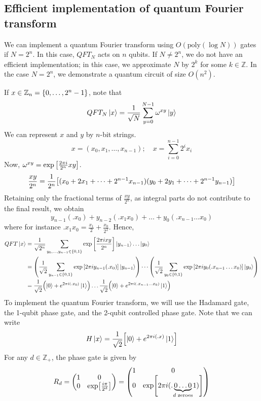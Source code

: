 \subsection{Efficient implementation of quantum Fourier transform}
We can implement a quantum Fourier transform using \( O(\mathrm{poly}(\log N)) \) gates if \( N = 2^n \).
In this case, \( QFT_N \) acts on \( n \) qubits.
If \( N \neq 2^n \), we do not have an efficient implementation; in this case, we approximate \( N \) by \( 2^k \) for some \( k \in \mathbb Z \).
In the case \( N = 2^n \), we demonstrate a quantum circuit of size \( O(n^2) \).

If \( x \in \mathbb Z_n = \qty{0, \dots, 2^n - 1} \), note that
\[ QFT_N \ket{x} = \frac{1}{\sqrt{N}} \sum_{y=0}^{N-1} \omega^{xy} \ket{y} \]
We can represent \( x \) and \( y \) by \( n \)-bit strings.
\[ x = (x_0, x_1, \dots, x_{n-1});\quad x = \sum_{i=0}^{n-1} 2^i x_i \]
Now, \( \omega^{xy} = \exp\qty[\frac{2\pi i}{2^n} xy] \).
\[ \frac{xy}{2^n} = \frac{1}{2^n} \qty[(x_0 + 2x_1 + \dots + 2^{n-1} x_{n-1})(y_0 + 2y_1 + \dots + 2^{n-1} y_{n-1})] \]
Retaining only the fractional terms of \( \frac{xy}{2^n} \), as integral parts do not contribute to the final result, we obtain
\[ y_{n-1}(.x_0) + y_{n-2}(.x_1 x_0) + \dots + y_0(.x_{n-1} \dots x_0) \]
where for instance \( .x_1 x_0 = \frac{x_1}{2} + \frac{x_0}{2^2} \).
Hence,
\begin{align*}
    QFT \ket{x} &= \frac{1}{\sqrt{2^n}} \sum_{y_0, \dots, y_{n-1} \in \qty{0,1}} \exp\qty[\frac{2\pi i xy}{2^n}] \ket{y_{n-1}} \dots \ket{y_0} \\
    &= \qty(\frac{1}{\sqrt{2}} \sum_{y_{n-1} \in \qty{0,1}} \exp\qty[2 \pi i y_{n-1} (.x_0)] \ket{y_{n-1}}) \cdots \qty(\frac{1}{\sqrt{2}} \sum_{y_0 \in \qty{0,1}} \exp\qty[2 \pi i y_0 (.x_{n-1}\dots x_0)] \ket{y_0}) \\
    &= \frac{1}{\sqrt{2}} \qty(\ket{0} + e^{2\pi i (.x_0)} \ket{1}) \dots \frac{1}{\sqrt{2}} \qty(\ket{0} + e^{2\pi i (.x_{n-1} \dots x_0)} \ket{1})
\end{align*}
To implement the quantum Fourier transform, we will use the Hadamard gate, the 1-qubit phase gate, and the 2-qubit controlled phase gate.
Note that we can write
\[ H\ket{x} = \frac{1}{\sqrt{2}} \qty[\ket{0} + e^{2\pi i(.x)} \ket{1}] \]
For any \( d \in \mathbb Z_+ \), the phase gate is given by
\[ R_d = \begin{pmatrix}
    1 & 0 \\
    0 & \exp[\frac{i\pi}{2^d}]
\end{pmatrix} = \begin{pmatrix}
    1 & 0 \\
    0 & \exp[2\pi i(.\underbrace{0\dots 0}_{\mathclap{d \text{ zeroes}}}1)]
\end{pmatrix} \]
